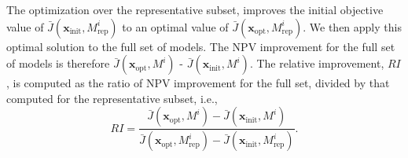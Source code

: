 \documentclass[11pt]{article}
\begin{document}
The optimization over the representative subset, improves the initial objective value of $\bar{J}(\mathbf{x}_{\text{init}},M^i_{\text{rep}})$
to an optimal value of $\bar{J}(\mathbf{x}_{\text{opt}},M^i_{\text{rep}})$.
We then apply this optimal solution to the full set of models.
The NPV improvement for the full set of models is therefore
$\bar{J}(\mathbf{x}_{\text{opt}},M^i)$ - $\bar{J}(\mathbf{x}_{\text{init}},M^i)$.
The relative improvement, $RI$, is computed as the ratio of NPV improvement for the full set, divided by that computed for the representative subset, i.e.,
%
\begin{equation}\label{eq:RI}
RI = \frac{\bar{J}(\mathbf{x}_{\text{opt}},M^i) - \bar{J}(\mathbf{x}_{\text{init}},M^i)}{\bar{J}(\mathbf{x}_{\text{opt}},M^i_{\text{rep}}) - \bar{J}(\mathbf{x}_{\text{init}},M^i_{\text{rep}})}.
\end{equation}
%
\end{document}
